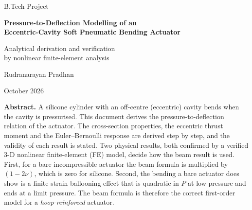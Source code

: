 \documentclass[11pt,a4paper]{article}
\numberwithin{equation}{section}
\begin{document}
\begin{titlepage}
\centering
\vspace*{2.2cm}
{\large B.Tech Project\par}
\vspace{0.6cm}
{\LARGE\bfseries Pressure-to-Deflection Modelling of an\\[4pt]
Eccentric-Cavity Soft Pneumatic Bending Actuator\par}
\vspace{0.8cm}
{\large Analytical derivation and verification\\
by nonlinear finite-element analysis\par}
\vspace{1.6cm}


\vspace{1.6cm}
{\large Rudranarayan Pradhan\par}
\vspace{0.3cm}
{\normalsize October 2026\par}
\vfill
\begin{minipage}{0.86\textwidth}
\small\textbf{Abstract.}
A silicone cylinder with an off-centre (eccentric) cavity bends when the cavity is pressurised.
This document derives the pressure-to-deflection relation of the actuator.
The cross-section properties, the eccentric thrust moment and the Euler--Bernoulli response are
derived step by step, and the validity of each result is stated.
Two physical results, both confirmed by a verified 3-D nonlinear finite-element (FE) model, decide how the beam result is used.
First, for a bare incompressible actuator the beam formula is multiplied by $(1-2\nu)$, which is zero for silicone.
Second, the bending a bare actuator does show is a finite-strain ballooning effect that is quadratic in $P$ at low pressure and ends at a limit pressure.
The beam formula is therefore the correct first-order model for a \emph{hoop-reinforced} actuator.
\end{minipage}
\vspace{0.8cm}
\end{titlepage}
\end{document}
